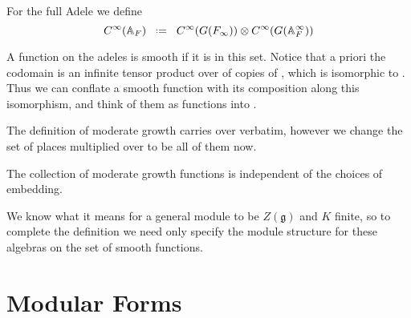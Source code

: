 	For the full Adele we define 
	\[C^\infty(\mathbb{A}_F) \defeq C^\infty(G(F_\infty)) \otimes C^\infty(G(\mathbb{A}_F^\infty))\]
	
	A function on the adeles is smooth if it is in this set. Notice that a priori the codomain is an infinite tensor product over \C of copies of \C, which is isomorphic to \C. Thus we can conflate a smooth function with its composition along this isomorphism, and think of them as functions into \C.
	
	The definition of moderate growth carries over verbatim, however we change the set of places multiplied over to be all of them now.
    
    \begin{remark}
        The collection of moderate growth functions is independent of the choices of embedding. 
    \end{remark}
    
    We know what it means for a general module to be \(Z(\mathfrak{g})\) and \(K\) finite, so to complete the definition we need only specify the module structure for these algebras on the set of smooth functions. 

\section{Modular Forms}